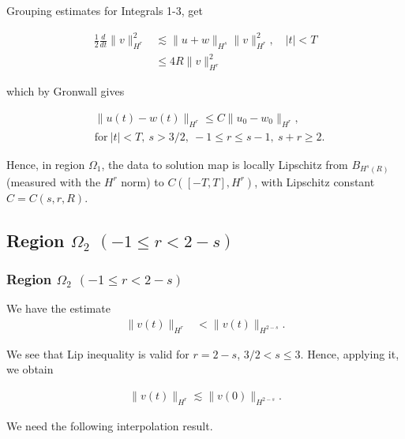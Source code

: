 \documentclass{beamer}
\numberwithin{equation}{section}
\begin{document}
\begin{frame}
Grouping estimates for Integrals 1-3, get


\begin{equation*}
\begin{split}
\frac{1}{2} \frac{d}{dt}
\|v\|_{H^r}^2
& \lesssim \|u+w\|_{H^s}
\|v\|_{H^r}^2, \quad | t | < T
\\
& \le 4R \| v \|_{H^{r}}^{2}
\label{9v}
\end{split}
\end{equation*}

\pause
which by Gronwall gives

\begin{equation*}
  \label{lip-ineq}
\begin{split}
  & \| u(t) - w(t) \|_{H^{r}} \le C \| u_{0} - w_{0} \|_{H^{r}}, 
  \\
  & \text{for} \ | t | < T,
  \ s > 3/2, \ -1 \le r \le s-1, \ s + r \ge 2.
\end{split}
\end{equation*}

\pause

Hence, in region $\Omega_{1}$, the data to solution map is locally Lipschitz from
$B_{H^{s}(R)}$ (measured with the $H^{r}$
norm) to $C([-T, T], H^{r})$, with Lipschitz constant $C = C(s, r, R)$.

\end{frame}


\subsection{Region $\Omega_{2}$ $(-1 \le r < 2-s)$} 

\begin{frame}
\frametitle{Region $\Omega_{2}$ $(-1 \le r < 2-s)$} 

We have the estimate
\begin{equation*}
  \label{fgh}
\begin{split}
  \| v(t) \|_{H^{r}}
  & < \|v(t) \|_{H^{2-s}}.
    \end{split}
\end{equation*}

\end{frame}
\begin{frame}
We see that Lip inequality is valid for $r = 2-s$, $3/2 < s \le 3$.
Hence, applying it, we obtain 




\begin{equation*}
\begin{split}
\| v(t) \|_{H^{r}}
 \lesssim \|v(0) \|_{H^{2-s}}.
\end{split}
\end{equation*}





We need the following interpolation
result. 
 \end{frame} 
\end{document}
